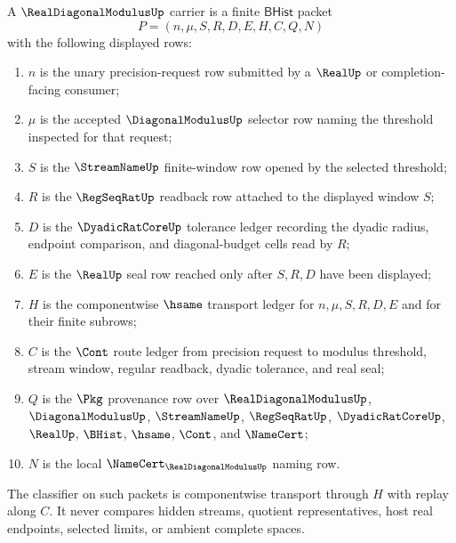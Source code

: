 \begin{definition}
\label{def:real-diagonal-modulus-carrier}
A $\RealDiagonalModulusUp$ carrier is a finite $\mathsf{BHist}$ packet
$$
P=(n,\mu,S,R,D,E,H,C,Q,N)
$$
with the following displayed rows:
\begin{enumerate}
\item $n$ is the unary precision-request row submitted by a $\RealUp$ or completion-facing consumer;
\item $\mu$ is the accepted $\DiagonalModulusUp$ selector row naming the threshold inspected for that request;
\item $S$ is the $\StreamNameUp$ finite-window row opened by the selected threshold;
\item $R$ is the $\RegSeqRatUp$ readback row attached to the displayed window $S$;
\item $D$ is the $\DyadicRatCoreUp$ tolerance ledger recording the dyadic radius, endpoint comparison, and diagonal-budget cells read by $R$;
\item $E$ is the $\RealUp$ seal row reached only after $S,R,D$ have been displayed;
\item $H$ is the componentwise $\hsame$ transport ledger for $n,\mu,S,R,D,E$ and for their finite subrows;
\item $C$ is the $\Cont$ route ledger from precision request to modulus threshold, stream window, regular readback, dyadic tolerance, and real seal;
\item $Q$ is the $\Pkg$ provenance row over $\RealDiagonalModulusUp$, $\DiagonalModulusUp$, $\StreamNameUp$, $\RegSeqRatUp$, $\DyadicRatCoreUp$, $\RealUp$, $\BHist$, $\hsame$, $\Cont$, and $\NameCert$;
\item $N$ is the local $\NameCert_{\RealDiagonalModulusUp}$ naming row.
\end{enumerate}
The classifier on such packets is componentwise transport through $H$ with replay along $C$. It never compares hidden streams, quotient representatives, host real endpoints, selected limits, or ambient complete spaces.
\end{definition}

